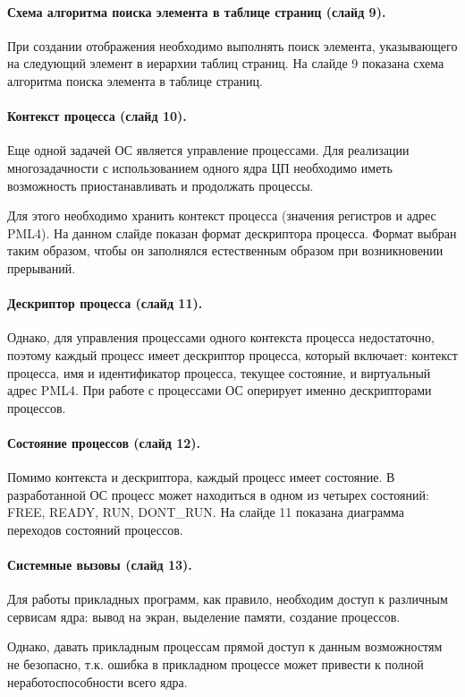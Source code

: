 \documentclass[12pt]{article}
\begin{document}
\paragraph{Схема алгоритма поиска элемента в таблице страниц (слайд 9).}
При создании отображения необходимо выполнять поиск элемента, указывающего на следующий элемент
в иерархии таблиц страниц. На слайде 9 показана схема алгоритма поиска элемента в таблице страниц.

\paragraph{Контекст процесса (слайд 10).}
Еще одной задачей ОС является управление процессами. Для реализации многозадачности с
использованием одного ядра ЦП необходимо иметь возможность приостанавливать и продолжать процессы.

Для этого необходимо хранить контекст процесса (значения регистров и адрес PML4). На данном слайде
показан формат дескриптора процесса. Формат выбран таким образом, чтобы он заполнялся естественным
образом при возникновении прерываний.

\paragraph{Дескриптор процесса (слайд 11).}
Однако, для управления процессами одного контекста процесса недостаточно, поэтому каждый
процесс имеет дескриптор процесса, который включает: контекст процесса, имя и идентификатор процесса,
текущее состояние, и виртуальный адрес PML4. При работе с процессами ОС оперирует
именно дескрипторами процессов.

\paragraph{Состояние процессов (слайд 12).}
Помимо контекста и дескриптора, каждый процесс имеет состояние. В разработанной ОС процесс
может находиться в одном из четырех состояний: FREE, READY, RUN, DONT\_RUN. На слайде 11
показана диаграмма переходов состояний процессов.

\paragraph{Системные вызовы (слайд 13).}
Для работы прикладных программ, как правило, необходим доступ к различным сервисам ядра: вывод
на экран, выделение памяти, создание процессов.

Однако, давать прикладным процессам прямой доступ к данным возможностям не безопасно, т.к.
ошибка в прикладном процессе может привести к полной неработоспособности всего ядра.
\end{document}
